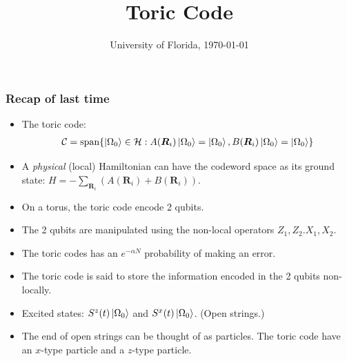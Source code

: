 \documentclass{beamer}
\title{Toric Code}
\date{University of Florida, \today}
\newcommand{\mc}{\mathcal}
\renewcommand{\(}{\left(}
\renewcommand{\)}{\right)}
\renewcommand{\[}{\left[}
\renewcommand{\]}{\right]}
\begin{document}
\frame{\titlepage} 



\begin{frame}
    \frametitle{Recap of last time}

    \begin{itemize}
        \item The toric code: \begin{align*}
            \mc C = \text{span}\{\ket{\Omega_0} \in \mc H : A(\bm R_i)\ket{\Omega_0} = \ket{\Omega_0}, B(\bm R_i)\ket{\Omega_0} = \ket{\Omega_0} \}
            \end{align*}
        \item A \emph{physical} (local) Hamiltonian can have the codeword space as its ground state: $H = -\sum_{\bm R_i} \(A(\bm R_i)  + B(\bm R_i) \)$.
        \item On a torus, the toric code encode 2 qubits. 
        \item The 2 qubits are manipulated using the non-local operators $Z_1, Z_2. X_1, X_2$. 
        \item The toric codes has an $e^{-\alpha N}$ probability of making an error. 
        \item The toric code is said to store the information encoded in the 2 qubits non-locally. 
        \item Excited states: $S^z(t)\ket{\Omega_0}$ and $S^x(t)\ket{\Omega_0}$. (Open strings.)
        \item The end of open strings can be thought of as particles. The toric code have an $x$-type particle and a $z$-type particle.  
    \end{itemize}

\end{frame}
\end{document}
